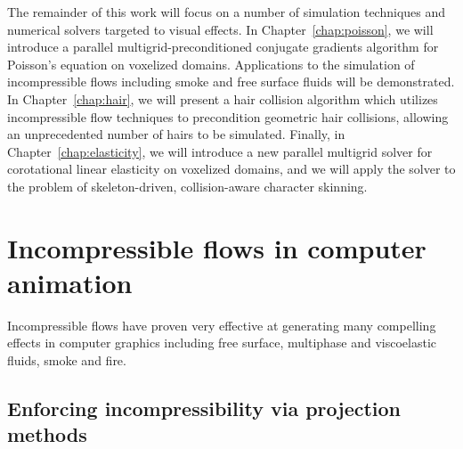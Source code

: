 The remainder of this work will focus on a number of simulation
techniques and numerical solvers targeted to visual effects.  In
Chapter~\ref{chap:poisson}, we will introduce a parallel
multigrid-preconditioned conjugate gradients algorithm for Poisson's
equation on voxelized domains. Applications to the simulation of
incompressible flows including smoke and free surface fluids will be
demonstrated.  In Chapter~\ref{chap:hair}, we will
present a hair collision algorithm which utilizes incompressible flow
techniques to precondition geometric hair collisions, allowing an
unprecedented number of hairs to be simulated.  Finally, in
Chapter~\ref{chap:elasticity}, we will introduce a new parallel multigrid
solver for corotational linear elasticity on voxelized domains, and we
will apply the solver to the problem of skeleton-driven,
collision-aware character skinning.  

\section{Incompressible flows in computer animation}
Incompressible flows have proven very effective at generating many
compelling effects in computer graphics including free surface,
multiphase and viscoelastic fluids, smoke and fire.  
	\subsection{Enforcing incompressibility via projection methods}
	

